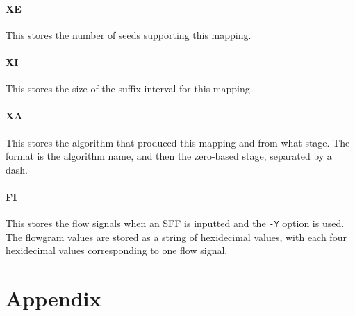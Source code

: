 \documentclass[a4paper,12pt]{book}
\newcommand{\TT}[1]{{\tt #1}} %
\begin{document}
\subsubsection{XE}
This stores the number of seeds supporting this mapping.

\subsubsection{XI}
This stores the size of the suffix interval for this mapping.

\subsubsection{XA}
This stores the algorithm that produced this mapping and from what stage.
The format is the algorithm name, and then the zero-based stage, separated by a dash.

\subsubsection{FI}
This stores the flow signals when an SFF is inputted and the \TT{-Y} option is used.
The flowgram values are stored as a string of hexidecimal values, with each four hexidecimal values corresponding to one flow signal.

\chapter{Appendix}

{}


\end{document}
